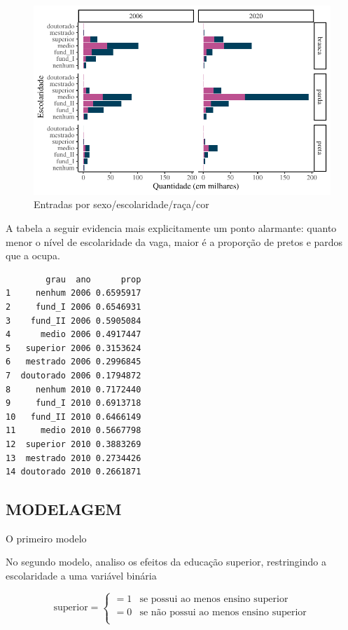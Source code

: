 \documentclass[
  12pt,
  letterpaper,
  DIV=11,
  numbers=noendperiod]{scrartcl}
\begin{document}
\begin{figure}

{\centering \includegraphics[width=1\textwidth,height=\textheight]{monografia_files/figure-pdf/entradas por sexo/escolaridade/raca-1.pdf}

}

\caption{Entradas por sexo/escolaridade/raça/cor}

\end{figure}

A tabela a seguir evidencia mais explicitamente um ponto alarmante:
quanto menor o nível de escolaridade da vaga, maior é a proporção de
pretos e pardos que a ocupa.

\begin{verbatim}
        grau  ano      prop
1     nenhum 2006 0.6595917
2     fund_I 2006 0.6546931
3    fund_II 2006 0.5905084
4      medio 2006 0.4917447
5   superior 2006 0.3153624
6   mestrado 2006 0.2996845
7  doutorado 2006 0.1794872
8     nenhum 2010 0.7172440
9     fund_I 2010 0.6913718
10   fund_II 2010 0.6466149
11     medio 2010 0.5667798
12  superior 2010 0.3883269
13  mestrado 2010 0.2734426
14 doutorado 2010 0.2661871
\end{verbatim}

\hypertarget{modelagem}{%
\subsection{MODELAGEM}\label{modelagem}}

O primeiro modelo

No segundo modelo, analiso os efeitos da educação superior, restringindo
a escolaridade a uma variável binária

\[
\text{superior}=
\begin{cases}
    =1 & \text{se possui ao menos ensino superior} \\
    =0 & \text{se não possui ao menos ensino superior} \\
\end{cases}
\]
\end{document}
